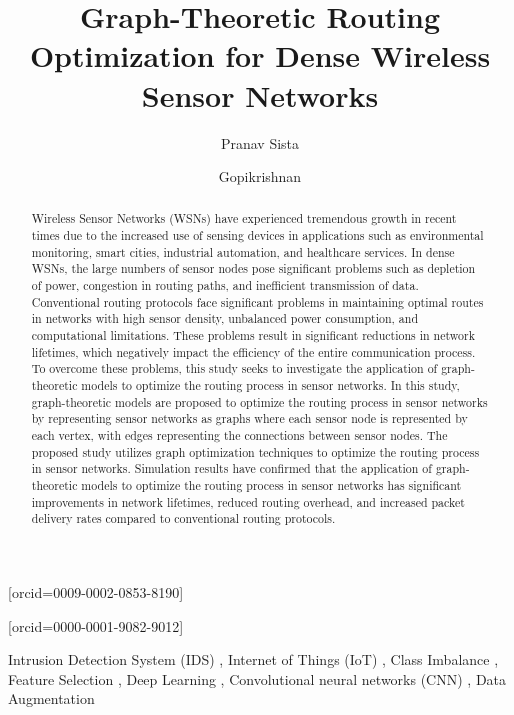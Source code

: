 \documentclass[a4paper,fleqn]{cas-dc}
\numberwithin{equation}{section}
\begin{document}
\let\WriteBookmarks\relax
\def\floatpagepagefraction{1}
\def\textpagefraction{.001}


\title[mode = title]{Graph-Theoretic Routing Optimization for Dense Wireless Sensor Networks}

\author[1]{Pranav Sista}[orcid=0009-0002-0853-8190]
\cormark[1]
\address[1]{School of Computer Science and Engineering, VIT-AP University, Amaravathi. Andhra Pradesh, India}

\author[1]{Gopikrishnan}[orcid=0000-0001-9082-9012]


\begin{abstract}
Wireless Sensor Networks (WSNs) have experienced tremendous growth in recent times due to the increased use of sensing devices in applications such as environmental monitoring, smart cities, industrial automation, and healthcare services. In dense WSNs, the large numbers of sensor nodes pose significant problems such as depletion of power, congestion in routing paths, and inefficient transmission of data. Conventional routing protocols face significant problems in maintaining optimal routes in networks with high sensor density, unbalanced power consumption, and computational limitations. These problems result in significant reductions in network lifetimes, which negatively impact the efficiency of the entire communication process. To overcome these problems, this study seeks to investigate the application of graph-theoretic models to optimize the routing process in sensor networks. In this study, graph-theoretic models are proposed to optimize the routing process in sensor networks by representing sensor networks as graphs where each sensor node is represented by each vertex, with edges representing the connections between sensor nodes. The proposed study utilizes graph optimization techniques to optimize the routing process in sensor networks. Simulation results have confirmed that the application of graph-theoretic models to optimize the routing process in sensor networks has significant improvements in network lifetimes, reduced routing overhead, and increased packet delivery rates compared to conventional routing protocols.
\end{abstract}

\begin{keywords}
Intrusion Detection System (IDS) \sep
Internet of Things (IoT) \sep
Class Imbalance \sep
Feature Selection \sep
Deep Learning \sep
Convolutional neural networks (CNN) \sep
Data Augmentation
\end{keywords}
\end{document}
